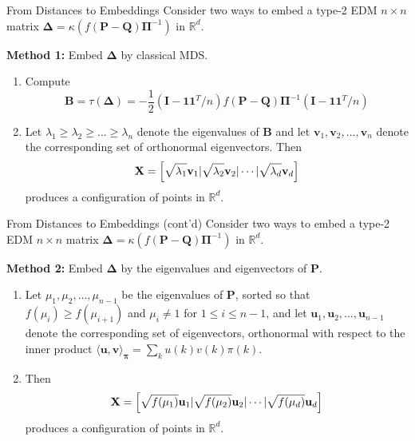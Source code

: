 \documentclass[professionalfonts,hyperref={pdfpagelabels=false,colorlinks=true,linkcolor=red}]{beamer}
\begin{document}
\begin{frame}{From Distances to Embeddings}
  Consider two ways to embed a type-2 EDM $n \times n$ matrix
  $\bm{\Delta} = \kappa(f(\mathbf{P} - \mathbf{Q})\bm{\Pi}^{-1})$ in
  $\mathbb{R}^{d}$. 
  
  \vskip10pt {\bf Method 1:} Embed $\bm{\Delta}$ by classical MDS.  
  \begin{enumerate}
  \item Compute 
    \begin{equation*}
      \mathbf{B} = \tau(\bm{\Delta}) = -\frac{1}{2}(\mathbf{I} -
      \bm{1}\bm{1}^{T}/n) f(\mathbf{P} - \mathbf{Q})\bm{\Pi}^{-1} (\mathbf{I} -
      \bm{1}\bm{1}^{T}/n)
    \end{equation*}
  \item Let $\lambda_1 \geq \lambda_2 \geq \dots \geq \lambda_n$
    denote the eigenvalues of $\mathbf{B}$ and let $\bm{v}_1,
    \bm{v}_2, \dots, \bm{v}_n$ denote the corresponding set of
    orthonormal eigenvectors. Then
    \begin{equation*}
      \mathbf{X} = \Bigl[ \sqrt{\lambda_1} \mathbf{v}_1 |
      \sqrt{\lambda_2} \mathbf{v}_{2} | \cdots |
      \sqrt{\lambda_d} \mathbf{v}_d \Bigr]
    \end{equation*}
    produces a configuration of points in $\mathbb{R}^{d}$.
  \end{enumerate}
\end{frame}
    
\begin{frame}{From Distances to Embeddings (cont'd)}
  Consider two ways to embed a type-2 EDM $n \times n$ matrix
  $\bm{\Delta} = \kappa(f(\mathbf{P} - \mathbf{Q})\bm{\Pi}^{-1})$ in
  $\mathbb{R}^{d}$. 
  
  \vskip10pt {\bf Method 2:} Embed $\bm{\Delta}$ by the eigenvalues
  and eigenvectors of $\mathbf{P}$. 
  \begin{enumerate}
  \item Let $\mu_1, \mu_2, \dots, \mu_{n-1}$ be the eigenvalues of
    $\mathbf{P}$, sorted so that $f(\mu_{i}) \geq f(\mu_{i+1})$ and
    $\mu_i \not= 1$ for $1 \leq i \leq n - 1$, and let $\bm{u}_1,
    \bm{u}_2, \dots, \bm{u}_{n-1}$ denote the corresponding set of
    eigenvectors, orthonormal with respect to the inner product
    $\langle
    \bm{u}, \bm{v} \rangle_{\bm{\pi}} = \sum_{k}{u(k) v(k) \pi(k)}$.
  \item Then
    \begin{equation*}
      \mathbf{X} = \Bigl[ \sqrt{f(\mu_1)} \mathbf{u}_1 |
      \sqrt{f(\mu_2)} \mathbf{u}_{2} | \cdots |
      \sqrt{f(\mu_d)} \mathbf{u}_d \Bigr]
    \end{equation*}
    produces a configuration of points in $\mathbb{R}^{d}$.
  \end{enumerate}
\end{frame}
\end{document}
